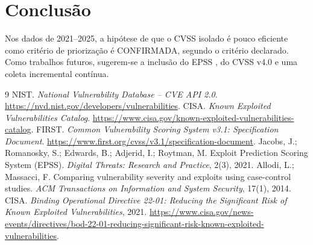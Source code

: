 \documentclass[11pt,a4paper]{article}
\begin{document}
\section{Conclusão}
Nos dados de 2021–2025, a hipótese de que o CVSS isolado é pouco eficiente como critério de priorização é CONFIRMADA, segundo o critério declarado. Como trabalhos futuros, sugerem-se a inclusão do EPSS \cite{epss}, do CVSS v4.0 e uma coleta incremental contínua.

\begin{thebibliography}{9}
 NIST. \textit{National Vulnerability Database -- CVE API 2.0}. \url{https://nvd.nist.gov/developers/vulnerabilities}.
 CISA. \textit{Known Exploited Vulnerabilities Catalog}. \url{https://www.cisa.gov/known-exploited-vulnerabilities-catalog}.
 FIRST. \textit{Common Vulnerability Scoring System v3.1: Specification Document}. \url{https://www.first.org/cvss/v3.1/specification-document}.
 Jacobs, J.; Romanosky, S.; Edwards, B.; Adjerid, I.; Roytman, M. Exploit Prediction Scoring System (EPSS). \textit{Digital Threats: Research and Practice}, 2(3), 2021.
 Allodi, L.; Massacci, F. Comparing vulnerability severity and exploits using case-control studies. \textit{ACM Transactions on Information and System Security}, 17(1), 2014.
 CISA. \textit{Binding Operational Directive 22-01: Reducing the Significant Risk of Known Exploited Vulnerabilities}, 2021. \url{https://www.cisa.gov/news-events/directives/bod-22-01-reducing-significant-risk-known-exploited-vulnerabilities}.
\end{thebibliography}
\end{document}
